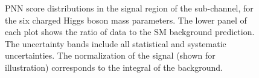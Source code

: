 \begin{figure}
		\caption{\label{fig:taulepPNNscoreSR1_body} PNN score distributions in the
		signal region of the \tauel sub-channel, for the six charged Higgs boson mass parameters.
		The lower panel of each plot shows the ratio of data to the \acrshort{SM} background prediction. The uncertainty bands include all statistical and systematic uncertainties.
		The normalization of the signal (shown for illustration) corresponds to the integral of the background.}
		\end{figure}

